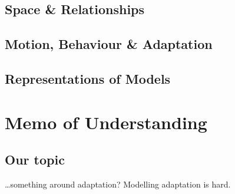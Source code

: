 \documentclass{article}
\begin{document}
\subsection{Space \& Relationships}
\subsection{Motion, Behaviour \& Adaptation}
\subsection{Representations of Models} %


\section{Memo of Understanding} %

\subsection{Our topic}

\ldots{}something around adaptation? Modelling adaptation is hard.



\end{document}
